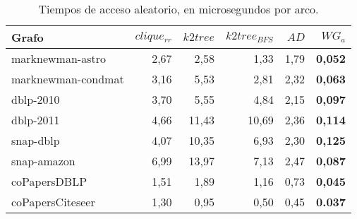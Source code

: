 \begin{table}
	\caption{Tiempos de acceso aleatorio, en microsegundos por arco.}
	\label{table:timesRandom}
	\centering
	\begin{tabular}{l|r|r|r|r|r}
		\toprule
		Grafo & $clique_{rr}$ & $k2tree$ & $k2tree_{BFS}$ & $AD$ & $WG_{a}$ \\
        \midrule    
        marknewman-astro & 2,67 & 2,58 & 1,33 & 1,79 & \textbf{0,052} \\
        marknewman-condmat & 3,16 & 5,53 & 2,81 & 2,32 & \textbf{0,063} \\
        dblp-2010 & 3,70 & 5,55 & 4,84 & 2,15 & \textbf{0,097} \\
        dblp-2011 & 4,66 & 11,43 & 10,69 & 2,36 & \textbf{0,114} \\
        snap-dblp & 4,07 & 10,35 & 6,93 & 2,30 & \textbf{0,125} \\
        snap-amazon & 6,99 & 13,97 & 7,13 & 2,47 & \textbf{0,087} \\
        coPapersDBLP & 1,51 & 1,89 & 1,16 & 0,73 & \textbf{0,045} \\
        coPapersCiteseer & 1,30 & 0,95 & 0,50 & 0,45 & \textbf{0.037} \\
        \bottomrule
	\end{tabular}
\end{table}
